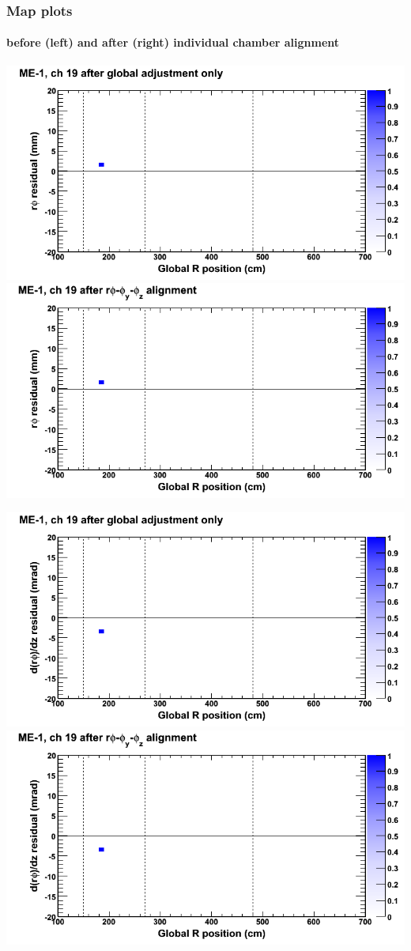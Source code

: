 \documentclass[compress]{beamer}
\begin{document}
\begin{frame}
\frametitle{Map plots}
\framesubtitle{before (left) and after (right) individual chamber alignment}
\includegraphics[width=0.5\linewidth]{ringmapplots_3dof/before_CSCvsr_mem1ch19_x.png} \includegraphics[width=0.5\linewidth]{ringmapplots_3dof/after_CSCvsr_mem1ch19_x.png}

\includegraphics[width=0.5\linewidth]{ringmapplots_3dof/before_CSCvsr_mem1ch19_dxdz.png} \includegraphics[width=0.5\linewidth]{ringmapplots_3dof/after_CSCvsr_mem1ch19_dxdz.png}
\end{frame}
\end{document}
